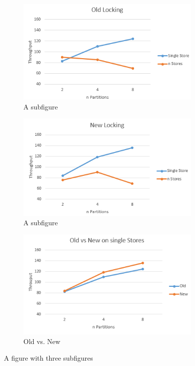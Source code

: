 \begin{figure}
    \centering
    \begin{subfigure}{.7\textwidth}
      \centering
      \includegraphics[width=.5\linewidth]{Figures/old_locking.PNG}
      \caption{A subfigure}
      \label{fig:oldlock}
    \end{subfigure}%
    \begin{subfigure}{.5\textwidth}
      \centering
      \includegraphics[width=.7\linewidth]{Figures/new_locking.PNG}
      \caption{A subfigure}
      \label{fig:newlock}
    \end{subfigure}
    \begin{subfigure}{.7\textwidth}
        \centering
        \includegraphics[width=.7\linewidth]{Figures/old_vs_new.PNG}
        \caption{Old vs. New}
        \label{fig:oldandnewlock}
      \end{subfigure}
    \caption{A figure with three subfigures}
    \label{fig:lock_comp}
\end{figure}




